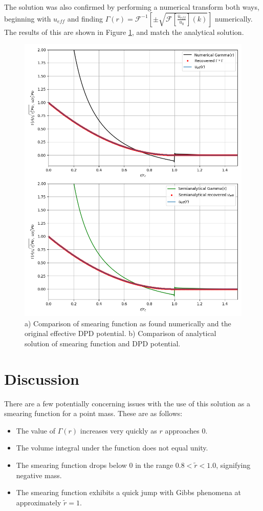 \documentclass{article}
\begin{document}
The solution was also confirmed by performing a numerical transform both ways, beginning with \(u_{eff}\) and finding \(\Gamma(r) = \mathcal{F}^{-1} \left[ \pm \sqrt{\mathcal{F}\left[\frac {\bar{u}_{eff}}{u_0} \right] (k)} \right]\) numerically. The results of this are shown in Figure \ref{fig:check_plot}, and match the analytical solution.

\begin{figure}
    \centering
    \includegraphics[width=0.95\linewidth]{check_fourier_transform.png}
    \caption{a) Comparison of smearing function as found numerically and the original effective DPD potential. b) Comparison of analytical solution of smearing function and DPD potential.}
    \label{fig:check_plot}
\end{figure}

\section{Discussion}
There are a few potentially concerning issues with the use of this solution as a smearing function for a point mass. These are as follows:
\begin{itemize}
    \item The value of \(\Gamma (r)\) increases very quickly as \(r\) approaches 0.
    \item The volume integral under the function does not equal unity.
    \item The smearing function drops below 0 in the range \(0.8 < \tilde r < 1.0\), signifying negative mass.
    \item The smearing function exhibits a quick jump with Gibbs phenomena at approximately \(\tilde r = 1\).
\end{itemize}
\end{document}
